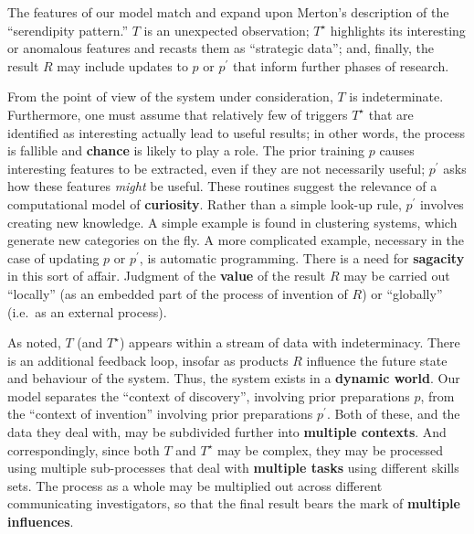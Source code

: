 The features of our model match and expand upon Merton's \citeyear{merton1948bearing} description of the ``serendipity pattern.'' $T$ is an unexpected observation; $T^\star$ highlights its interesting or anomalous features and recasts them as ``strategic data''; and, finally, the result $R$ may include updates to $p$ or $p^{\prime}$ that inform further phases of research.  

From the point of view of the system under consideration, $T$ is
indeterminate.  Furthermore, one must assume that relatively few of
triggers $T^\star$ that are identified as interesting actually lead to
useful results; in other words, the process is fallible and
\textbf{chance} is likely to play a role.
%
The prior training $p$ causes interesting features
to be extracted, even if they are not necessarily useful; $p^{\prime}$
asks how these features \emph{might} be useful.  These routines 
suggest the relevance of a computational model of \textbf{curiosity}.
%
Rather than a simple look-up rule, $p^{\prime}$ involves creating new knowledge.  A simple example is found in clustering systems, which generate new categories on the fly.  A more complicated example, necessary in the case of updating $p$ or $p^{\prime}$, is automatic programming.  There is a need for \textbf{sagacity} in this sort of affair.
%
Judgment of the \textbf{value} of the result $R$ may be carried out
``locally'' (as an embedded part of the process of invention of $R$)
or ``globally'' (i.e.~as an external process).

As noted, $T$ (and $T^\star$) appears within a stream of data with
indeterminacy.  There is an additional feedback loop, insofar as
products $R$ influence the future state and behaviour of the system.
Thus, the system exists in a \textbf{dynamic world}.
%
Our model separates the
``context of discovery'', involving prior preparations $p$, from the
``context of invention'' involving prior preparations $p^{\prime}$.
Both of these, and the data they deal with, may be subdivided further into \textbf{multiple contexts}. 
%
And correspondingly, since both $T$ and $T^\star$ may be complex, they
may be processed using multiple sub-processes that deal with
\textbf{multiple tasks} using different skills sets.
%
The process as a whole may be multiplied out across different
communicating investigators, so that the final result bears the mark
of \textbf{multiple influences}.




